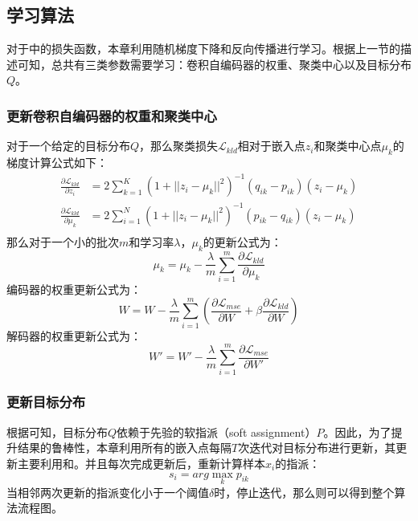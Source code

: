 \subsection{学习算法}
对于中的损失函数，本章利用随机梯度下降和反向传播进行学习。根据上一节的描述可知，总共有三类参数需要学习：卷积自编码器的权重、聚类中心以及目标分布$Q$。
\subsubsection{更新卷积自编码器的权重和聚类中心}
对于一个给定的目标分布$Q$，那么聚类损失$\mathscr{L}_{kld}$相对于嵌入点$z_i$和聚类中心点$\mu_k$的梯度计算公式如下：
\begin{align}
	\frac{\partial \mathscr{L}_{kld}}{\partial z_i} &= 2\sum_{k=1}^K(1+||z_i-\mu_k||^2)^{-1}(q_{ik}-p_{ik})(z_i-\mu_k) \\
	\frac{\partial \mathscr{L}_{kld}}{\partial \mu_k} &= 2\sum_{i=1}^N(1+||z_i-\mu_k||^2)^{-1}(p_{ik}-q_{ik})(z_i-\mu_k) \\
\end{align}
那么对于一个小的批次$m$和学习率$\lambda$，$\mu_k$的更新公式为：
\begin{equation}
	\mu_k=\mu_k-\frac{\lambda}{m}\sum_{i=1}^m{\frac{\partial \mathscr{L}_{kld}}{\partial \mu_k}}
\end{equation}
编码器的权重更新公式为：
\begin{equation}
	W=W-\frac{\lambda}{m}\sum_{i=1}^m(\frac{\partial \mathscr{L}_{mse}}{\partial W} + \beta \frac{\partial \mathscr{L}_{kld}}{\partial W})
	\label{equ:encoder_update}
\end{equation}
解码器的权重更新公式为：
\begin{equation}
	W'=W'-\frac{\lambda}{m}\sum_{i=1}^m{\frac{\partial \mathscr{L}_{mse}}{\partial W'}}
\end{equation}

\subsubsection{更新目标分布}
根据可知，目标分布$Q$依赖于先验的软指派（soft assignment）$P$。因此，为了提升结果的鲁棒性，本章利用所有的嵌入点每隔$T$次迭代对目标分布进行更新，其更新主要利用和。并且每次完成更新后，重新计算样本$x_i$的指派：
\begin{equation}
	s_i=arg \max \limits_k p_{ik}
	\label{equ:assign}
\end{equation}
当相邻两次更新的指派变化小于一个阈值$\delta$时，停止迭代，那么则可以得到整个算法流程图。

